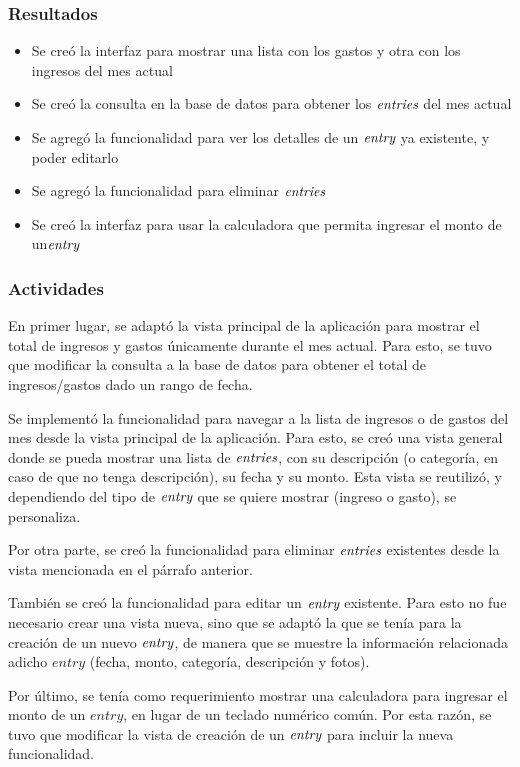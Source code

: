\subsubsection{Resultados}
\begin{itemize}
\item Se creó la interfaz para mostrar una lista con los gastos y otra con los ingresos del mes actual
\item Se creó la consulta en la base de datos para obtener los $\textit{entries}$ del mes actual
\item Se agregó la funcionalidad para ver los detalles de un $\textit{entry}$ ya existente, y poder editarlo
\item Se agregó la funcionalidad para eliminar $\textit{entries}$
\item Se creó la interfaz para usar la calculadora que permita ingresar el monto de un$\textit{entry}$
\end{itemize}

\subsubsection{Actividades}
En primer lugar, se adaptó la vista principal de la aplicación para mostrar el total de ingresos y gastos únicamente durante el mes actual. Para esto, se tuvo que modificar la consulta a la base de datos para obtener el total de ingresos/gastos dado un rango de fecha.

Se implementó la funcionalidad para navegar a la lista de ingresos o de gastos del mes desde la vista principal de la aplicación. Para esto, se creó una vista general donde se pueda mostrar una lista de $\textit{entries}$, con su descripción (o categoría, en caso de que no tenga descripción), su fecha y su monto. Esta vista se reutilizó, y dependiendo del tipo de $\textit{entry}$ que se quiere mostrar (ingreso o gasto), se personaliza.

Por otra parte, se creó la funcionalidad para eliminar $\textit{entries}$ existentes desde la vista mencionada en el párrafo anterior.

También se creó la funcionalidad para editar un $\textit{entry}$ existente. Para esto no fue necesario crear una vista nueva, sino que se adaptó la que se tenía para la creación de un nuevo $\textit{entry}$, de manera que se muestre la información relacionada adicho $entry$ (fecha, monto, categoría, descripción y fotos).

Por último, se tenía como requerimiento mostrar una calculadora para ingresar el monto de un $entry$, en lugar de un teclado numérico común. Por esta razón, se tuvo que modificar la vista de creación de un $\textit{entry}$ para incluir la nueva funcionalidad. 

